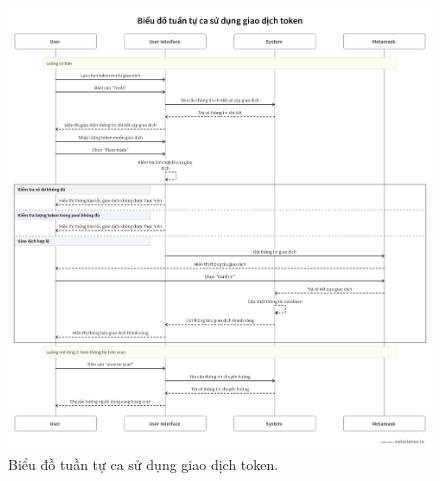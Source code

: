 \begin{figure}[H]
    \centering
    \includegraphics[width=1\textwidth]{figures/c2/TradeSeq.png}
    \caption{Biểu đồ tuần tự ca sử dụng giao dịch token.}
    \label{fig:architecture-diagram}
\end{figure}

